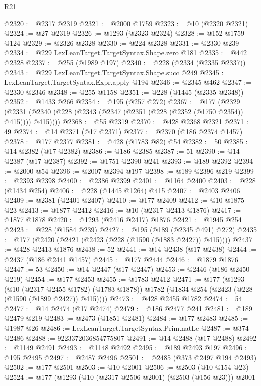 \begin{lexlean}{R21}
\begin{coremodule}
@2320 := @2317 @2319
@2321 := @2000 @1759
@2323 := @10 (@2320 @2321)
@2324 := @27 @2319
@2326 := @1293 (@2323 @2324)
@2328 := @152 @1759 @124
@2329 := @2326 @2328
@2330 := @224 @2328
@2331 := @2330 @239
@2334 := @229 LexLeanTarget.TargetSyntax.Shape.zero @181
@2335 := @442 @2328
@2337 := @255 (@1989 @197)
@2340 := @228 (@2334 (@2335 @2337))
@2343 := @229 LexLeanTarget.TargetSyntax.Shape.succ @249
@2345 := LexLeanTarget.TargetSyntax.Expr.apply @194
@2346 := @2345 @462
@2347 := @2330 @2346
@2348 := @255 @1158
@2351 := @228 (@1445 (@2335 @2348))
@2352 := @1433 @266
@2354 := @195 (@257 @272)
@2367 := @177
    (@2329 (@2331 (@2340 (@228 (@2343 (@2347 (@2351 (@228 (@2352 (@1750 @2354)) @415)))) @415))))
@2368 := @55 @2319
@2370 := @428 @2368 @2321
@2371 := 49
@2374 := @14 @2371 (@17 @2371)
@2377 := @2370 (@186 @2374 @1457)
@2378 := @177 @2377
@2381 := @428 (@1783 @82) @54
@2382 := 50
@2385 := @14 @2382 (@17 @2382)
@2386 := @186 @2385
@2387 := 51
@2390 := @14 @2387 (@17 @2387)
@2392 := @1751 @2390 @241
@2393 := @189 @2392
@2394 := @2000 @54
@2396 := @2007 @2394 @197
@2398 := @189 @2396 @219
@2399 := @2393 @2398
@2400 := @2386 @2399
@2401 := @1164 @2400
@2403 := @228 (@1434 @254)
@2406 := @228 (@1445 @1264) @415
@2407 := @2403 @2406
@2409 := @2381 (@2401 @2407)
@2410 := @177 @2409
@2412 := @10 @1875 @23
@2413 := @1877 @2412
@2416 := @10 (@2317 @2413 @1876)
@2417 := @1877 @1878
@2420 := @1293 (@2416 @2417) @1876
@2421 := @1945 @254
@2423 := @228 (@1584 @239)
@2427 := @195 (@189 (@2345 @491) @272)
@2435 := @177 (@2420 (@2421 (@2423 (@228 (@1590 (@1883 @2427)) @415))))
@2437 := @428 @2413 @1876
@2438 := 52
@2441 := @14 @2438 (@17 @2438)
@2444 := @2437 (@186 @2441 @1457)
@2445 := @177 @2444
@2446 := @1879 @1876
@2447 := 53
@2450 := @14 @2447 (@17 @2447)
@2453 := @2446 (@186 @2450 @219)
@2454 := @177 @2453
@2455 := @1783 @2412
@2471 := @177
    (@1293
      (@10 (@2317 @2455 @1782) (@1783 @1878))
      @1782
      (@1834 @254 (@2423 (@228 (@1590 (@1899 @2427)) @415))))
@2473 := @428 @2455 @1782
@2474 := 54
@2477 := @14 @2474 (@17 @2474)
@2479 := @186 @2477 @241
@2481 := @189 @2479 @219
@2483 := @2473 (@1851 @2481)
@2484 := @177 @2483
@2485 := @1987 @26
@2486 := LexLeanTarget.TargetSyntax.Prim.natLe
@2487 := @374 @2486
@2488 := 9223372036854775807
@2491 := @14 @2488 (@17 @2488)
@2492 := @1149 @2491
@2493 := @1148 @2492
@2495 := @189 @2493 @197
@2496 := @195 @2495
@2497 := @2487 @2496
@2501 := @2485 (@373 @2497 @194 @2493)
@2502 := @177 @2501
@2503 := @10 @2001
@2506 := @2503 (@10 @154 @23)
@2524 := @177
    (@1293
      (@10 (@2317 @2506 @2001) (@2503 (@156 @23)))
      @2001

\end{coremodule}
\end{lexlean}
